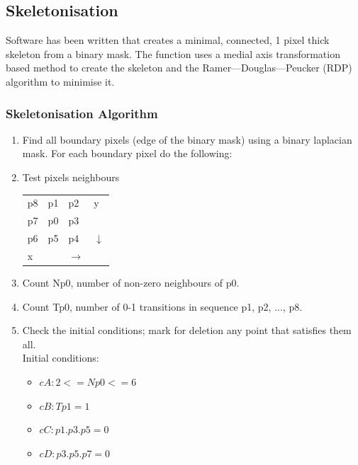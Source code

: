 \documentclass[a4paper, 12pt]{article}
\begin{document}
	\subsection{Skeletonisation}
	Software has been written that creates a minimal, connected, 1 pixel thick skeleton from a binary mask. The function uses a medial axis transformation based method \cite{skeletonisation}  to create the skeleton and the Ramer--–Douglas–--Peucker\cite{Ramer}\cite{Douglas_Peucker} (RDP) algorithm to minimise it.
%
\subsubsection{Skeletonisation Algorithm}
        \begin{enumerate}
   		\item Find all boundary pixels (edge of the binary mask) using a binary laplacian mask\cite{binary_laplacian}. For each boundary pixel do the following:
        \item{Test pixels neighbours
\begin{table}[H]
\centering
\begin{tabular}{llll}
\cline{1-3}
\multicolumn{1}{|l|}{p8} & \multicolumn{1}{l|}{p1} & \multicolumn{1}{l|}{p2} & y \\ \cline{1-3}
\multicolumn{1}{|l|}{p7} & \multicolumn{1}{l|}{p0} & \multicolumn{1}{l|}{p3} &  \\ \cline{1-3}
\multicolumn{1}{|l|}{p6} & \multicolumn{1}{l|}{p5} & \multicolumn{1}{l|}{p4} & $\downarrow$ \\ \cline{1-3}
x &  & $\rightarrow$ & 
\end{tabular}
\end{table}}
%
        \item Count Np0, number of non-zero neighbours of p0.
        \item Count Tp0, number of 0-1 transitions in sequence p1, p2, ..., p8.
        \item Check the initial conditions; mark for deletion any point that satisfies them all.\\
        Initial conditions:
        \begin{itemize}
         \item $cA:     2 <= Np0 <= 6$
         \item $cB:     Tp1 = 1$
         \item $cC:     p1 . p3 . p5 = 0$
         \item $cD:     p3 . p5 . p7 = 0$
         \end{itemize} 
         

\end{enumerate}
\end{document}
